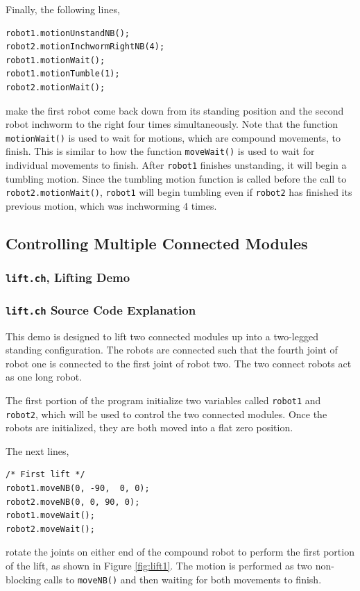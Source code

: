 \documentclass{article}
\begin{document}
Finally, the following lines,
\begin{verbatim}
robot1.motionUnstandNB();
robot2.motionInchwormRightNB(4);
robot1.motionWait();
robot1.motionTumble(1);
robot2.motionWait();
\end{verbatim}
make the first robot come back down from its standing position and the second robot
inchworm to the right four times simultaneously. Note that the function 
\texttt{motionWait()} is used to wait for motions, which are compound
movements, to finish. This is similar to how
the function \texttt{moveWait()} is used to wait for individual movements
to finish. After \texttt{robot1} finishes unstanding, it will begin 
a tumbling motion. Since the tumbling motion function is called before the call
to \texttt{robot2.motionWait()}, \texttt{robot1} will begin tumbling even if
\texttt{robot2} has finished its previous motion, which was inchworming 4 times.

\subsection{Controlling Multiple Connected Modules}
\subsubsection{\texttt{lift.ch}, Lifting Demo}

\subsubsection{\texttt{lift.ch} Source Code Explanation}
This demo is designed to lift two connected modules up into
a two-legged standing configuration. The robots are connected such that the fourth
joint of robot one is connected to the first joint of robot two. The two connect robots
act as one long robot.

The first portion of the program initialize two variables called \texttt{robot1} 
and \texttt{robot2}, which will be used to control the two connected modules.
Once the robots are initialized, they are both moved into a flat zero position.

The next lines,
\begin{verbatim}
/* First lift */
robot1.moveNB(0, -90,  0, 0);
robot2.moveNB(0, 0, 90, 0);
robot1.moveWait();
robot2.moveWait();
\end{verbatim}
rotate the joints on either end of the compound robot to perform the 
first portion of the lift, as shown in Figure \ref{fig:lift1}. The motion is performed as two non-blocking
calls to \texttt{moveNB()} and then waiting for both movements to finish.
\end{document}

